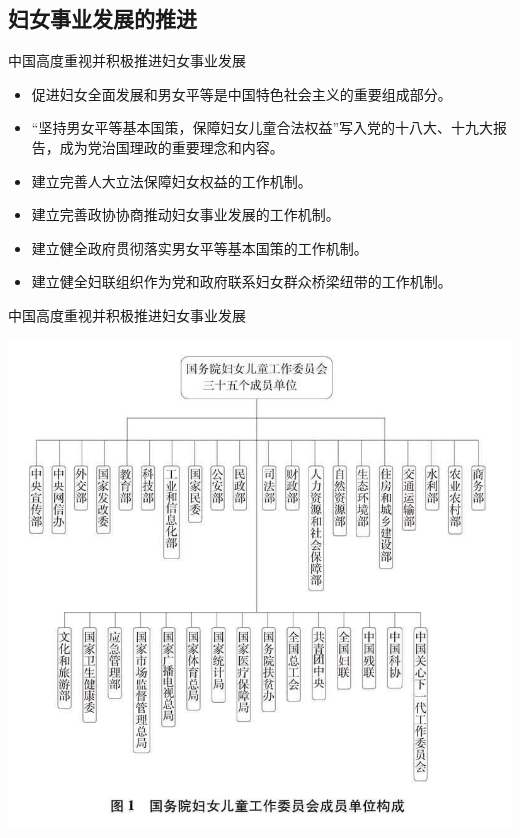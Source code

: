 \subsection{妇女事业发展的推进}
\begin{frame}{中国高度重视并积极推进妇女事业发展}
    \begin{block}{}
        \begin{itemize}
            \item 促进妇女全面发展和男女平等是中国特色社会主义的重要组成部分。
            \item “坚持男女平等基本国策，保障妇女儿童合法权益”写入党的十八大、十九大报告，成为党治国理政的重要理念和内容。
            \item 建立完善人大立法保障妇女权益的工作机制。
            \item 建立完善政协协商推动妇女事业发展的工作机制。
            \item 建立健全政府贯彻落实男女平等基本国策的工作机制。
            \item 建立健全妇联组织作为党和政府联系妇女群众桥梁纽带的工作机制。
        \end{itemize}
    \end{block}
\end{frame}

\begin{frame}{中国高度重视并积极推进妇女事业发展}
    \begin{center}
        \includegraphics[width=.55\textwidth]{../docs/img/2-1.jpg}
    \end{center}
\end{frame}

